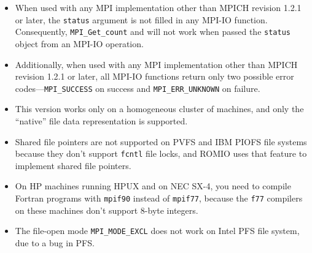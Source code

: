 \begin{itemize}
\item When used with any MPI implementation other than MPICH revision
1.2.1 or later, the {\tt status} argument is not filled in any MPI-IO
function. Consequently, {\tt MPI\_Get\_count} and will not work when passed the {\tt status} object
from an MPI-IO operation.

\item Additionally, when used with any MPI implementation other than MPICH
revision 1.2.1 or later, all MPI-IO functions return only two possible
error codes---{\tt MPI\_SUCCESS} on success and {\tt MPI\_ERR\_UNKNOWN}
on failure.

\item This version works only on a homogeneous cluster of machines,
and only the ``native'' file data representation is supported.

\item Shared file pointers are not supported on PVFS and IBM PIOFS
file systems because they don't support {\tt fcntl} file locks,
and ROMIO uses that feature to implement shared file pointers.

\item On HP machines running HPUX and on NEC SX-4, you need to compile
Fortran programs with {\tt mpif90} instead of {\tt mpif77}, because
the {\tt f77} compilers on these machines don't support 8-byte integers.

\item The file-open mode {\tt MPI\_MODE\_EXCL} does not work on Intel
PFS file system, due to a bug in PFS.

\end{itemize}


%
%
